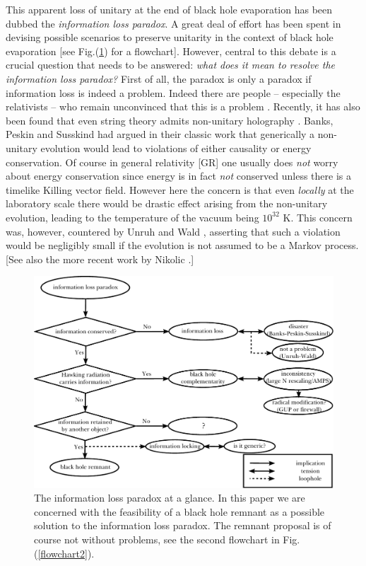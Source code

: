 \documentclass[12pt]{article}
\newcommand{\2}{$^2$}
\newcommand{\3}{$^3$}
\newcommand{\4}{$_4$}
\newcommand{\5}{$_5$}
\begin{document}
This apparent loss of unitary at the  end of black hole evaporation has been dubbed the \emph{information loss paradox}\cite{hawking1976}. A great deal of effort has been spent in devising possible scenarios to preserve unitarity in the context of black hole evaporation [see Fig.(\ref{flowchart1}) for a flowchart]. However, central to this debate is a crucial question that needs to be answered: \emph{what does it mean to resolve the information loss paradox?} First of all, the paradox is only a paradox if information loss is indeed a problem. Indeed there are people -- especially the relativists -- who remain unconvinced that this is a problem \cite{Wald1, HP}. Recently, it has also been found that even string theory admits non-unitary holography \cite{vafa}. Banks, Peskin and Susskind had argued in their classic work \cite{BPS0}  that generically a non-unitary evolution would lead to violations of  either causality or energy conservation. 
Of course in general relativity [GR] one usually does \emph{not} worry about energy conservation since energy is in fact \emph{not} conserved unless there is a timelike Killing vector field. However here the concern is that even \emph{locally} at the laboratory scale there would be drastic effect arising from the non-unitary evolution, leading to the temperature of the vacuum being $10^{32}$ K. This concern was, however, countered by Unruh and Wald \cite{WU}, asserting that such a violation would be negligibly small if the evolution is not assumed to be a Markov process. [See also the more recent work by Nikolic \cite{nikolic}.]

\begin{figure}
\begin{center}
\includegraphics[scale=0.72]{flowchart_1.pdf}
\caption{\label{flowchart1} The information loss paradox at a glance. In this paper we are concerned with the feasibility of a black hole remnant as a possible solution to the information loss paradox. The remnant proposal is of course not without problems, see the second flowchart in Fig.(\ref{flowchart2}).}
\end{center}
\end{figure}
\end{document}
